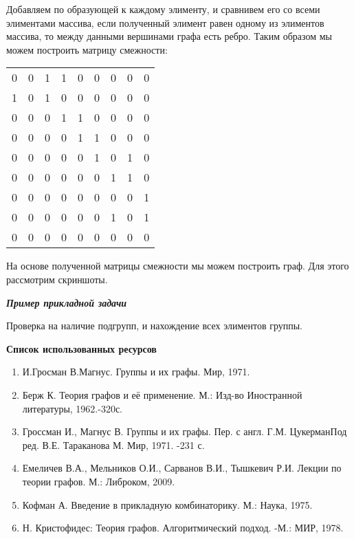 \newpage

Добавляем по образующей к каждому элименту, и сравнивем его со всеми элиментами массива, если полученный элимент равен одному из элиментов массива, то между данными вершинами графа есть ребро. Таким образом мы можем построить матрицу смежности:

\vspace{\baselineskip}

\begin{tabular}{*{9}{c}}
  0 & 0 & 1 & 1 & 0 & 0 & 0 & 0 & 0 \\
  1 & 0 & 1 & 0 & 0 & 0 & 0 & 0 & 0 \\
  0 & 0 & 0 & 1 & 1 & 0 & 0 & 0 & 0 \\
  0 & 0 & 0 & 0 & 1 & 1 & 0 & 0 & 0 \\
  0 & 0 & 0 & 0 & 0 & 1 & 0 & 1 & 0 \\
  0 & 0 & 0 & 0 & 0 & 0 & 1 & 1 & 0 \\
  0 & 0 & 0 & 0 & 0 & 0 & 0 & 0 & 1 \\
  0 & 0 & 0 & 0 & 0 & 0 & 1 & 0 & 1 \\
  0 & 0 & 0 & 0 & 0 & 0 & 0 & 0 & 0 \\
\end{tabular}

На основе полученной матрицы смежности мы можем построить граф. Для этого рассмотрим скриншоты.


\begin{center}
  \textbf{\textit{Пример прикладной задачи}}
\end{center}

Проверка на наличие подгрупп, и нахождение всех элиментов группы.

\newpage

\begin{center}
  \large{\textbf{Список использованных ресурсов}}
\end{center}

\begin{enumerate}
  \item И.Гросман В.Магнус. Группы и их графы. Мир, 1971.

  \item Берж К. Теория графов и её применение. М.: Изд-во Иностранной литературы, 1962.-320с.

  \item Гроссман И., Магнус В. Группы и их графы. Пер. с англ. Г.М. ЦукерманПод ред. В.Е. Тараканова М. Мир, 1971. -231 с.

  \item Емеличев В.А., Мельников О.И., Сарванов В.И., Тышкевич Р.И. Лекции по теории графов. М.: Либроком, 2009.

  \item Кофман А. Введение в прикладную комбинаторику. М.: Наука, 1975.

  \item Н. Кристофидес: Теория графов. Алгоритмический подход. -М.: МИР, 1978.
\end{enumerate}
